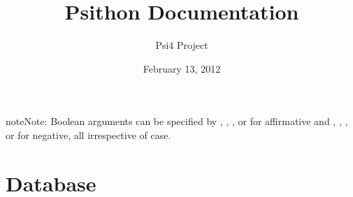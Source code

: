 \documentclass[letterpaper,10pt,english]{sphinxmanual}
\title{Psithon Documentation}
\date{February 13, 2012}
\author{Psi4 Project}
\begin{document}
\maketitle
\tableofcontents
{}\label{index::doc}


\begin{notice}{note}{Note:}
Boolean arguments can be specified by , , , or 
for affirmative and , , , or  for negative,
all irrespective of case.
\end{notice}
\label{index:module-wrappers2}

\chapter{Database}
\label{index:welcome-to-psithon-s-documentation}\label{index:database}
\end{document}
